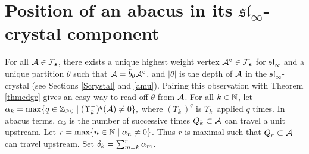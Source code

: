 \documentclass[12pt]{amsart}
\numberwithin{equation}{section}
\theoremstyle{definition}
\newcommand{\slinf}{\mathfrak{sl}_\infty}
\begin{document}





\section{Position of an abacus in its $\slinf$-crystal component}\label{depth}


For all $\mathcal{A}\in\mathcal{F}_{\mathbf{s}}$, there exists a unique highest weight vertex $\mathcal{A}^\circ\in\mathcal{F}_{\mathbf{s}}$ for $\slinf$
and a unique partition $\theta$ such that $\mathcal{A} = {\tilde{b}}_\theta \mathcal{A}^\circ$, and $|\theta|$ is the depth of $\mathcal{A}$ in the $\slinf$-crystal (see Sections \ref{Scrystal} and \ref{amu}). Pairing this observation with Theorem \ref{thmedge} gives an easy way to read off $\theta$ from $\mathcal{A}$.
For all $k\in\mathbb{N}$, let $\alpha_k=\max\{q\in \mathbb{Z}_{\geq 0} \mid (\Upsilon_k^-)^q(\mathcal{A})\neq 0\},$ where $(\Upsilon_k^-)^q$ is $\Upsilon_k^-$ applied $q$ times. In abacus terms, $\alpha_k$ is the number of successive times $Q_k\subset\mathcal{A}$ can travel a unit upstream. Let $r=\max\{n\in\mathbb{N}\mid\alpha_n\neq 0\}$. Thus $r$ is maximal such that $Q_r\subset \mathcal{A}$ can travel upstream. Set $\delta_k = \sum_{m=k}^r \alpha_m$.
 
\end{document}
